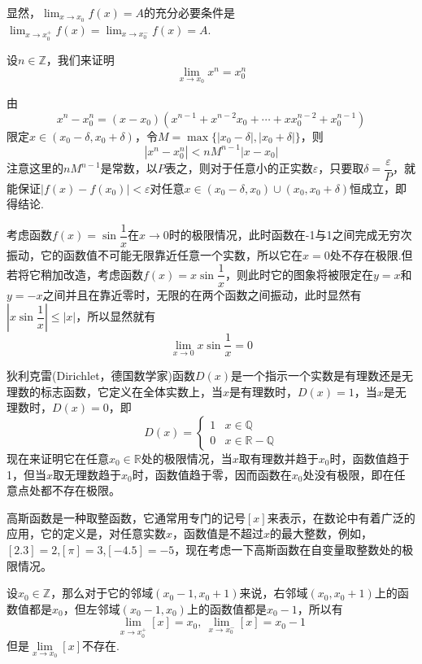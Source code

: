   显然，$\lim_{x \to x_0} f(x) = A$的充分必要条件是 $\lim_{x \to x_0^+} f(x) = \lim_{x \to x_0^-} f(x) = A$.
 
\begin{example}
  \label{example:limit-of-x-power-integer}
  设$n \in \mathbb{Z}$，我们来证明
  \[ \lim_{x \to x_0} x^n = x_0^n \]

  由
  \[ x^n-x_0^n = (x-x_0)(x^{n-1}+x^{n-2}x_0+\cdots+xx_0^{n-2}+x_0^{n-1}) \]
  限定$x \in (x_0-\delta,x_0+\delta)$，令$M=\max\{|x_0-\delta|,|x_0+\delta|\}$，则
  \[ |x^n-x_0^n| < nM^{n-1}|x-x_0| \]
  注意这里的$nM^{n-1}$是常数，以$P$表之，则对于任意小的正实数$\varepsilon$，只要取$\delta=\dfrac{\varepsilon}{P}$，就能保证$|f(x)-f(x_0)|<\varepsilon$对任意$x \in (x_0-\delta,x_0)\cup(x_0,x_0+\delta)$恒成立，即得结论.
\end{example}

\begin{example}
  \label{example:limit-of-sin-1-over-x-at-0}
  考虑函数$f(x)=\sin{\dfrac{1}{x}}$在$x \to 0$时的极限情况，此时函数在-1与1之间完成无穷次振动，它的函数值不可能无限靠近任意一个实数，所以它在$x=0$处不存在极限.但若将它稍加改造，考虑函数$f(x)=x\sin{\dfrac{1}{x}}$，则此时它的图象将被限定在$y=x$和$y=-x$之间并且在靠近零时，无限的在两个函数之间振动，此时显然有$|x\sin{\dfrac{1}{x}}|\leqslant |x|$，所以显然就有
  \[ \lim_{x \to 0} x \sin{\frac{1}{x}} = 0 \]
\end{example}

\begin{example}
  \label{example:limit-of-dirichlet-function}
  狄利克雷(Dirichlet，德国数学家)函数$D(x)$是一个指示一个实数是有理数还是无理数的标志函数，它定义在全体实数上，当$x$是有理数时，$D(x)=1$，当$x$是无理数时，$D(x)=0$，即
  \[
    D(x) =
    \begin{cases}
      1 & x \in \mathbb{Q} \\
      0 & x \in \mathbb{R}-\mathbb{Q}
    \end{cases}
  \]
  现在来证明它在任意$x_0 \in \mathbb{R}$处的极限情况，当$x$取有理数并趋于$x_0$时，函数值趋于1，但当$x$取无理数趋于$x_0$时，函数值趋于零，因而函数在$x_0$处没有极限，即在任意点处都不存在极限。
\end{example}

  \begin{example}
    \label{example:single-limits-of-gausse-function}
    高斯函数是一种取整函数，它通常用专门的记号$[x]$来表示，在数论中有着广泛的应用，它的定义是，对任意实数$x$，函数值是不超过$x$的最大整数，例如，$[2.3]=2$,$[\pi]=3$,$[-4.5]=-5$，现在考虑一下高斯函数在自变量取整数处的极限情况。

    设$x_0 \in \mathbb{Z}$，那么对于它的邻域$(x_0-1,x_0+1)$来说，右邻域$(x_0,x_0+1)$上的函数值都是$x_0$，但左邻域$(x_0-1,x_0)$上的函数值都是$x_0-1$，所以有
    \[ \lim_{x \to x_0^+} [x] = x_0, \  \lim_{x \to x_0^-} [x] = x_0-1 \]
    但是$\lim\limits_{x \to x_0}[x]$不存在. 
\end{example}

